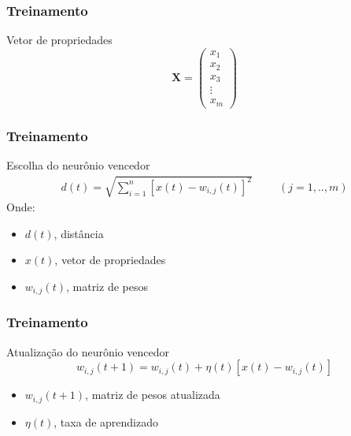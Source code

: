 \documentclass[10pt]{beamer} %
\begin{document}
\begin{frame}
	\frametitle{Treinamento}

\begin{block}{Vetor de propriedades}
 \begin{displaymath}
 \mathbf{X}=\left(\begin{array}{r}
x_{1}\\
x_{2}\\
x_{3}\\
  \vdots \\
x_{m}
 \end{array}\right)
 \label{inicio}
 \end{displaymath}
\end{block}
\end{frame}

\begin{frame}
	\frametitle{Treinamento}
	\begin{block}{Escolha do neurônio vencedor}
		 \begin{eqnarray}
		 d(t)= \sqrt{\sum^{n}_{i=1}[x(t)-w_{i,j}(t)]^{2}} \hspace{1cm}  (j = {1,..,m}) \nonumber
		 \label{euclidiana}
		 \end{eqnarray}
		 Onde:
	\end{block}
	\begin{itemize}
		\pause
		\item $d(t)$, distância 
		\pause
		\item $x(t)$, vetor de propriedades
		\pause
		\item $w_{i,j}(t)$, matriz de pesos
	\end{itemize}
\end{frame}

\begin{frame}
	\frametitle{Treinamento}
	\begin{block}{Atualização do neurônio vencedor}
	\begin{equation}
	w_{i,j}(t+1)=w_{i,j}(t)+\eta(t)[x(t)-w_{i,j}(t)] \nonumber
	\label{ajuste de pesos}
	\end{equation}
	\end{block}
		\begin{itemize}
			\pause
			\item $w_{i,j}(t+1)$, matriz de pesos atualizada
			\pause
			\item $\eta(t)$,  taxa de aprendizado
		\end{itemize}
\end{frame}
\end{document}

